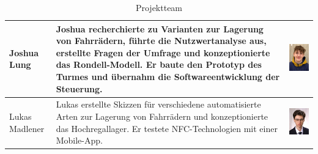 \begin{table}[H]
\begin{center}
\begin{tabular}{|p{}|p{}|p{}|}
      Joshua Lung    & Joshua recherchierte zu Varianten zur Lagerung von Fahrrädern, führte die Nutzwertanalyse aus, erstellte Fragen der Umfrage und konzeptionierte das Rondell-Modell. Er baute den Prototyp des Turmes und übernahm die Softwareentwicklung der Steuerung. & \begin{minipage}{.3\textwidth}\includegraphics{images/joshualung.jpg} \end{minipage}    \\
      \hline
      Lukas Madlener & Lukas erstellte Skizzen für verschiedene automatisierte Arten zur Lagerung von Fahrrädern und konzeptionierte das Hochregallager. Er testete NFC-Technologien mit einer Mobile-App.                                                                      & \begin{minipage}{.3\textwidth}\includegraphics{images/lukasmadlener.jpg} \end{minipage} \\
    \end{tabular}
    \caption{Projektteam}
    \label{tab:projektteam}
  \end{center}
\end{table}

